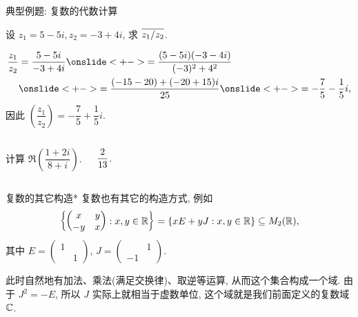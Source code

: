 \begin{frame}[<*>]{典型例题: 复数的代数计算}
\beqskip{3pt}
\onslide<+->
\vspace{-5pt}
\begin{example}
设 $z_1=5-5i,z_2=-3+4i$, 求 $\overline{z_1/z_2}$.
\end{example}
\onslide<+->
\vspace{-5pt}
\begin{solution}
\vspace{-\baselineskip}
\begin{align*}
\frac{z_1}{z_2}&=\frac{5-5i}{-3+4i}
\onslide<+->{=\frac{(5-5i)(-3-4i)}{(-3)^2+4^2}}\\
&\onslide<+->{=\frac{(-15-20)+(-20+15)i}{25}}
\onslide<+->{=-\frac75-\frac15i,}
\end{align*}
\onslide<+->
因此 $\left(\dfrac{z_1}{z_2}\right)=-\dfrac75+\dfrac15i$.
\end{solution}

\vspace{-5pt}
\onslide<+->
\begin{columns}
		\begin{exercise}
		计算 $\Re\left(\dfrac{1+2i}{8+i}\right)$.
		\end{exercise}
		\onslide<+->
		\begin{answer}
			$\dfrac2{13}\vphantom{\Re\left(\dfrac{1+2i}{8+i}\right)}$.
		\end{answer}
\end{columns}
\endgroup
\end{frame}


\begin{frame}{复数的其它构造*}
\onslide<+->
复数也有其它的构造方式, 
\onslide<+->
例如
\[{\left\{\begin{pmatrix}
x&y\\-y&x\end{pmatrix}: x,y\in{\mathbb{R}}\right\}}
={\left\{xE+yJ: x,y\in{\mathbb{R}}\right\}}\subseteq M_2({\mathbb{R}}),\]
\onslide<+->
其中 $E=\begin{pmatrix}1&\\&1\end{pmatrix}$,
$J=\begin{pmatrix}&1\\-1&\end{pmatrix}$.

\onslide<+->
此时自然地有加法、乘法(满足交换律)、取逆等运算, 从而这个集合构成一个域.
\onslide<+->
由于 $J^2=-E$, 所以 $J$ 实际上就相当于虚数单位, 这个域就是我们前面定义的复数域 ${\mathbb{C}}$.
\end{frame}



